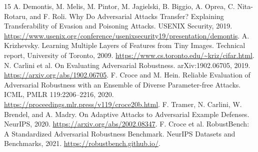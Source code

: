 \documentclass[10pt,twocolumn]{article}
\begin{document}
\begin{thebibliography}{15}
 A. Demontis, M. Melis, M. Pintor, M. Jagielski, B. Biggio, A. Oprea, C. Nita-Rotaru, and F. Roli. Why Do Adversarial Attacks Transfer? Explaining Transferability of Evasion and Poisoning Attacks. USENIX Security, 2019. \url{https://www.usenix.org/conference/usenixsecurity19/presentation/demontis}.
 A. Krizhevsky. Learning Multiple Layers of Features from Tiny Images. Technical report, University of Toronto, 2009. \url{https://www.cs.toronto.edu/~kriz/cifar.html}.
 N. Carlini et al. On Evaluating Adversarial Robustness. arXiv:1902.06705, 2019. \url{https://arxiv.org/abs/1902.06705}.
 F. Croce and M. Hein. Reliable Evaluation of Adversarial Robustness with an Ensemble of Diverse Parameter-free Attacks. ICML, PMLR 119:2206--2216, 2020. \url{https://proceedings.mlr.press/v119/croce20b.html}.
 F. Tramer, N. Carlini, W. Brendel, and A. Madry. On Adaptive Attacks to Adversarial Example Defenses. NeurIPS, 2020. \url{https://arxiv.org/abs/2002.08347}.
 F. Croce et al. RobustBench: A Standardized Adversarial Robustness Benchmark. NeurIPS Datasets and Benchmarks, 2021. \url{https://robustbench.github.io/}.
\end{thebibliography}
\end{document}
